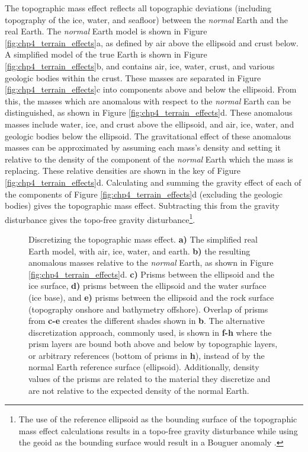 The topographic mass effect reflects all topographic deviations (including topography of the ice, water, and seafloor) between the \textit{normal} Earth and the real Earth. The \textit{normal} Earth model is shown in Figure \ref{fig:chp4_terrain_effects}a, as defined by air above the ellipsoid and crust below. A simplified model of the true Earth is shown in Figure \ref{fig:chp4_terrain_effects}b, and contains air, ice, water, crust, and various geologic bodies within the crust. These masses are separated in Figure \ref{fig:chp4_terrain_effects}c into components above and below the ellipsoid. From this, the masses which are anomalous with respect to the \textit{normal} Earth can be distinguished, as shown in Figure \ref{fig:chp4_terrain_effects}d. These anomalous masses include water, ice, and crust above the ellipsoid, and air, ice, water, and geologic bodies below the ellipsoid. The gravitational effect of these anomalous masses can be approximated by assuming each mass's density and setting it relative to the density of the component of the \textit{normal} Earth which the mass is replacing. These relative densities are shown in the key of Figure \ref{fig:chp4_terrain_effects}d. Calculating and summing the gravity effect of each of the components of Figure \ref{fig:chp4_terrain_effects}d (excluding the geologic bodies) gives the topographic mass effect. Subtracting this from the gravity disturbance gives the topo-free gravity disturbance\footnote{The use of the reference ellipsoid as the bounding surface of the topographic mass effect calculations results in a topo-free gravity disturbance while using the geoid as the bounding surface would result in a Bouguer anomaly \citep{vajdanew2006}.}.\\

\begin{figure}[!ht]
    \centering
    
    \caption[Discretizing the topographic mass effect]{Discretizing the topographic mass effect. \textbf{a)} The simplified real Earth model, with air, ice, water, and earth. \textbf{b)} the resulting anomalous masses relative to the \textit{normal} Earth, as shown in Figure \ref{fig:chp4_terrain_effects}d. \textbf{c)} Prisms between the ellipsoid and the ice surface, \textbf{d)} prisms between the ellipsoid and the water surface (ice base), and \textbf{e)} prisms between the ellipsoid and the rock surface (topography onshore and bathymetry offshore). Overlap of prisms from \textbf{c-e} creates the different shades shown in \textbf{b}. The alternative discretization approach, commonly used, is shown in \textbf{f-h} where the prism layers are bound both above and below by topographic layers, or arbitrary references (bottom of prisms in \textbf{h}), instead of by the normal Earth reference surface (ellipsoid). Additionally, density values of the prisms are related to the material they discretize and are not relative to the expected density of the normal Earth.}
    \label{fig:chp4_discretized_topo_mass_effect}
\end{figure}

